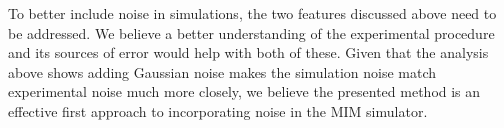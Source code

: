 		To better include noise in simulations, the two features discussed above need to be addressed.
		We believe a better understanding of the experimental procedure and its sources of error would help with both of these.
		Given that the analysis above shows adding Gaussian noise makes the simulation noise match experimental noise much more closely, we believe the presented method is an effective first approach to incorporating noise in the MIM simulator.









































